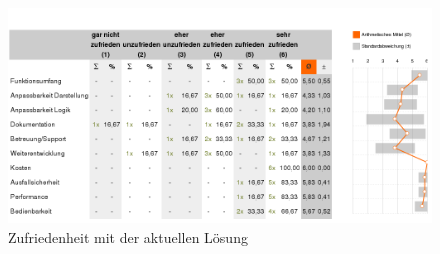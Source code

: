 	\begin{figure}[h]
		\centering
		\includegraphics[width=1\linewidth]{images/umfrage_zufriedenheit}
		\caption{Zufriedenheit mit der aktuellen Lösung}
		\label{fig:Umfrage_zufriedenheit}
	\end{figure}

